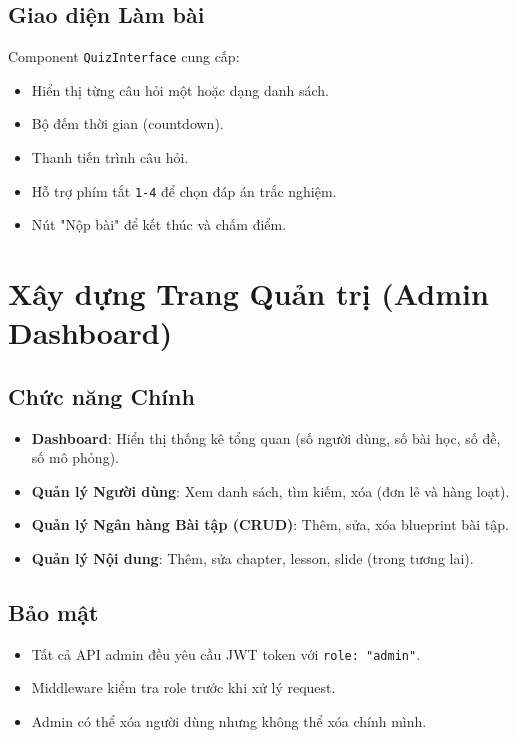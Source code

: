 \subsection{Giao diện Làm bài}

Component \texttt{QuizInterface} cung cấp:

\begin{itemize}
    \item Hiển thị từng câu hỏi một hoặc dạng danh sách.
    \item Bộ đếm thời gian (countdown).
    \item Thanh tiến trình câu hỏi.
    \item Hỗ trợ phím tắt \texttt{1-4} để chọn đáp án trắc nghiệm.
    \item Nút "Nộp bài" để kết thúc và chấm điểm.
\end{itemize}



\section{Xây dựng Trang Quản trị (Admin Dashboard)}

\subsection{Chức năng Chính}

\begin{itemize}
    \item \textbf{Dashboard}: Hiển thị thống kê tổng quan (số người dùng, số bài học, số đề, số mô phỏng).
    \item \textbf{Quản lý Người dùng}: Xem danh sách, tìm kiếm, xóa (đơn lẻ và hàng loạt).
    \item \textbf{Quản lý Ngân hàng Bài tập (CRUD)}: Thêm, sửa, xóa blueprint bài tập.
    \item \textbf{Quản lý Nội dung}: Thêm, sửa chapter, lesson, slide (trong tương lai).
\end{itemize}

\subsection{Bảo mật}

\begin{itemize}
    \item Tất cả API admin đều yêu cầu JWT token với \texttt{role: "admin"}.
    \item Middleware kiểm tra role trước khi xử lý request.
    \item Admin có thể xóa người dùng nhưng không thể xóa chính mình.
\end{itemize}

